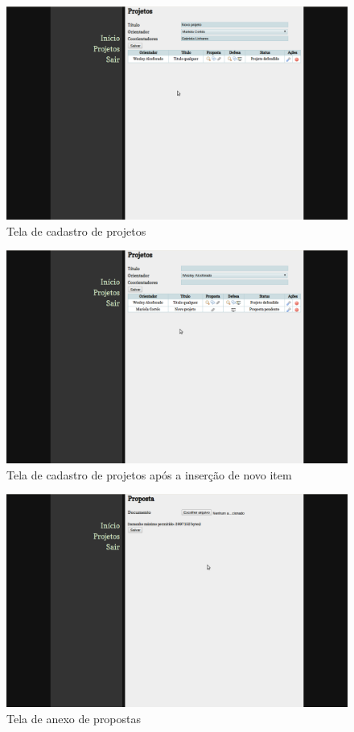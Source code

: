 \begin{figure}[htbp]
\centering
\includegraphics[width=1\textwidth]{fig/telas/processo/aluno_01_projeto_novo.png}
\caption{Tela de cadastro de projetos}
\label{fig:aluno_01_projeto_novo}
\end{figure}

\begin{figure}[htbp]
\centering
\includegraphics[width=1\textwidth]{fig/telas/processo/aluno_02_projeto_cadastrado.png}
\caption{Tela de cadastro de projetos após a inserção de novo item}
\label{fig:aluno_02_projeto_cadastrado}
\end{figure}

\begin{figure}[htbp]
\centering
\includegraphics[width=1\textwidth]{fig/telas/processo/aluno_03_anexo_proposta.png}
\caption{Tela de anexo de propostas}
\label{fig:aluno_03_anexo_proposta}
\end{figure}


